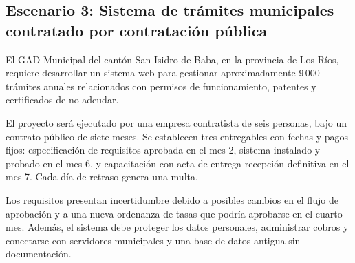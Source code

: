 \documentclass[12pt,a4paper]{article}
\begin{document}
\normalsize

\clearpage


\subsection{Escenario 3: Sistema de trámites municipales contratado por contratación pública}

El GAD Municipal del cantón San Isidro de Baba, en la provincia de Los Ríos, requiere desarrollar un sistema web para gestionar aproximadamente 9\,000 trámites anuales relacionados con permisos de funcionamiento, patentes y certificados de no adeudar.

El proyecto será ejecutado por una empresa contratista de seis personas, bajo un contrato público de siete meses. Se establecen tres entregables con fechas y pagos fijos: especificación de requisitos aprobada en el mes 2, sistema instalado y probado en el mes 6, y capacitación con acta de entrega-recepción definitiva en el mes 7. Cada día de retraso genera una multa.

Los requisitos presentan incertidumbre debido a posibles cambios en el flujo de aprobación y a una nueva ordenanza de tasas que podría aprobarse en el cuarto mes. Además, el sistema debe proteger los datos personales, administrar cobros y conectarse con servidores municipales y una base de datos antigua sin documentación.

\begingroup
\footnotesize
\setlength{\tabcolsep}{4pt}
\renewcommand{\arraystretch}{1.24}
\setlength{\LTleft}{0pt}
\setlength{\LTright}{0pt}
\end{document}
